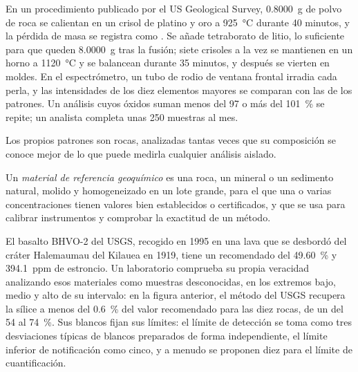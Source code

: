 \begin{inthelab}
En un procedimiento publicado por el US Geological Survey, \qty{0.8000}{g} de polvo de roca se calientan en un
crisol de platino y oro a \qty{925}{\celsius} durante 40 minutos, y la pérdida de masa se registra como
. Se añade tetraborato de litio, lo suficiente para que queden \qty{8.0000}{g} tras la fusión;
siete crisoles a la vez se mantienen en un horno a \qty{1120}{\celsius} y se balancean durante 35 minutos,
y después se vierten en moldes. En el espectrómetro, un tubo de rodio de ventana frontal irradia cada perla, y
las intensidades de los diez elementos mayores se comparan con las de los patrones. Un análisis cuyos
óxidos suman menos del 97 o más del \qty{101}{\percent} se repite; un analista completa
unas 250 muestras al mes.
\end{inthelab}

Los propios patrones son rocas, analizadas tantas veces que su composición se conoce mejor de lo que
puede medirla cualquier análisis aislado.

\begin{definition}\label{def:b2:field-lab-methods-2:rm}
Un \emph{material de referencia geoquímico} es una roca, un
mineral o un sedimento natural, molido y homogeneizado en un lote grande, para el que una o varias concentraciones
tienen valores bien establecidos o certificados, y que se usa para calibrar instrumentos y comprobar la exactitud
de un método.
\end{definition}

El basalto BHVO-2 del USGS, recogido en 1995 en una lava que se desbordó del cráter Halemaumau del
Kilauea en 1919, tiene un  recomendado del \qty{49.60}{\percent} y \qty{394.1}{ppm} de
estroncio. Un laboratorio comprueba su propia veracidad analizando esos materiales como muestras desconocidas, en los extremos bajo,
medio y alto de su intervalo: en la figura anterior, el método del USGS recupera la sílice a menos del
\qty{0.6}{\percent} del valor recomendado para las diez rocas, de un  del 54 al
\qty{74}{\percent}. Sus blancos fijan sus límites: el límite de detección se toma como tres desviaciones
típicas de blancos preparados de forma independiente, el límite inferior de notificación como cinco, y a menudo se
proponen diez para el límite de cuantificación.

